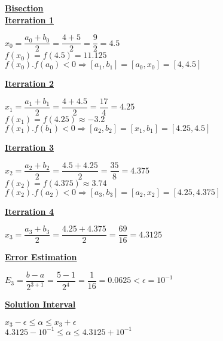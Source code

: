 \newpage
\textbf{\underline{Bisection}}\\[0.15cm]
\textbf{\underline{Iterration 1}}
\begin{center}
    \(x_0 = \dfrac{a_0+b_0}{2} = \dfrac{4+5}{2} = \dfrac{9}{2} = 4.5\)\\[0.4cm]
    \(f(x_0) = f(4.5) = 11.125\)\\[0.4cm]
    \(f(x_0) . f(a_0) < 0 \Rightarrow [a_1,b_1] = [a_0,x_0] =[4,4.5] \)
\end{center}

\vspace{0.8cm}

\textbf{\underline{Iterration 2}}
\begin{center}
    \(x_1 = \dfrac{a_1+b_1}{2} = \dfrac{4+4.5}{2}= \dfrac{17}{4} = 4.25\)\\[0.4cm]
    \(f(x_1) = f(4.25)  \approx -3.2\)\\[0.4cm]
    \(f(x_1) . f(b_1) < 0 \Rightarrow [a_2,b_2] = [x_1,b_1] = [4.25,4.5]\)
\end{center}

\vspace{0.8cm}

\textbf{\underline{Iterration 3}}
\begin{center}
    \(x_2 = \dfrac{a_2+b_2}{2} = \dfrac{4.5+4.25}{2} =\dfrac{35}{8} = 4.375\)\\[0.4cm]
    \(f(x_2) = f(4.375)  \approx 3.74\)\\[0.4cm]
    \(f(x_2) . f(a_2) < 0 \Rightarrow [a_3,b_3] = [a_2,x_2] = [4.25,4.375]\)
\end{center}

\vspace{0.8cm}

\textbf{\underline{Iterration 4}}
\begin{center}
    \(x_3 = \dfrac{a_3+b_3}{2} = \dfrac{4.25+4.375}{2} =\dfrac{69}{16} = 4.3125\)\\[0.4cm]
\end{center}

\vspace{1cm}


\textbf{\underline{Error Estimation}}
\begin{center}
    \(E_3 = \dfrac{b-a}{2^{3+1}} = \dfrac{5-1}{2^4} = \dfrac{1}{16} = \boxed{0.0625 < \epsilon = 10^{-1}}\) 
\end{center}

\vspace{0.3cm}
\textbf{\underline{Solution Interval}}
\begin{center}
   \(x_3 - \epsilon \leq \alpha \leq x_3 + \epsilon\)\\[0.1cm]
   \(\boxed{4.3125 - 10^{-1} \leq \alpha \leq 4.3125 + 10^{-1}}\)\\[0.1cm]
\end{center}

